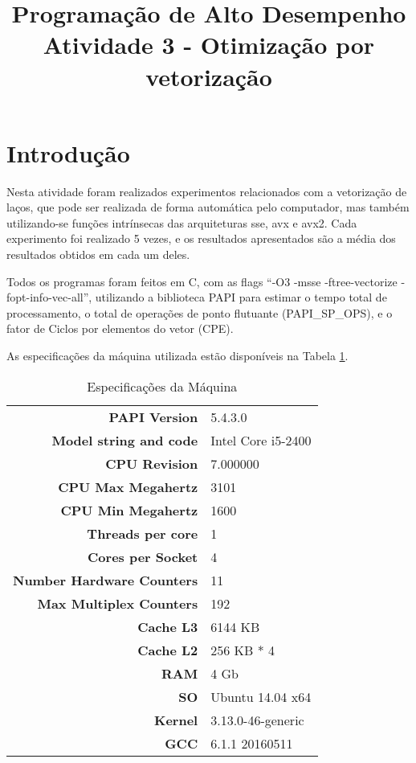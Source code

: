 \documentclass[conference]{IEEEtran}
\begin{document}
\title{Programação de Alto Desempenho\\
\large Atividade 3 - Otimização por vetorização}

\author{
 }

\maketitle


\section{Introdução}
Nesta atividade foram realizados experimentos relacionados com a vetorização de laços, que pode ser realizada de forma automática pelo computador, mas também utilizando-se funções intrínsecas das arquiteturas sse, avx e avx2.
Cada experimento foi realizado 5 vezes, e os resultados apresentados são a média dos resultados obtidos em cada um deles.

Todos os programas foram feitos em C, com as flags ``-O3 -msse -ftree-vectorize -fopt-info-vec-all'', utilizando a biblioteca PAPI para estimar o tempo total de processamento, o total de operações de ponto flutuante (PAPI\_SP\_OPS), e o fator de Ciclos por elementos do vetor (CPE).

As especificações da máquina utilizada estão disponíveis na Tabela \ref{tab:cpu}.

\begin{table}[htb!]
\centering
\caption{Especificações da Máquina}
\label{tab:cpu}
\begin{tabular}{rl}
\bf{PAPI Version            } & 5.4.3.0 \\
\bf{Model string and code   } & Intel Core i5-2400\\
\bf{CPU Revision            } & 7.000000 \\
\bf{CPU Max Megahertz       } & 3101 \\
\bf{CPU Min Megahertz       } & 1600 \\
\bf{Threads per core        } & 1 \\
\bf{Cores per Socket        } & 4 \\
\bf{Number Hardware Counters} & 11 \\
\bf{Max Multiplex Counters  } & 192 \\
\bf{Cache L3                } & 6144 KB \\
\bf{Cache L2                } & 256 KB * 4 \\
\bf{RAM                     } & 4 Gb \\
\bf{SO                      } & Ubuntu 14.04 x64 \\
\bf{Kernel                  } & 3.13.0-46-generic \\
\bf{GCC                     } & 6.1.1 20160511\\
\end{tabular}
\end{table}
\end{document}
